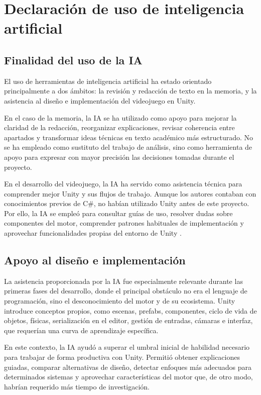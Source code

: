 \chapter{Declaración de uso de inteligencia artificial}

\section{Finalidad del uso de la IA}
El uso de herramientas de inteligencia artificial ha estado orientado principalmente a dos
ámbitos: la revisión y redacción de texto en la memoria, y la asistencia al diseño e
implementación del videojuego en Unity.

En el caso de la memoria, la IA se ha utilizado como apoyo para mejorar la claridad de la
redacción, reorganizar explicaciones, revisar coherencia entre apartados y transformar
ideas técnicas en texto académico más estructurado. No se ha empleado como sustituto del
trabajo de análisis, sino como herramienta de apoyo para expresar con mayor precisión las
decisiones tomadas durante el proyecto.

En el desarrollo del videojuego, la IA ha servido como asistencia técnica para comprender
mejor Unity y sus flujos de trabajo. Aunque los autores contaban con conocimientos previos
de C\#, no habían utilizado Unity antes de este proyecto. Por ello, la IA se empleó para
consultar guías de uso, resolver dudas sobre componentes del motor, comprender patrones
habituales de implementación y aprovechar funcionalidades propias del entorno de Unity \cite{unityLearnGettingStarted,unityScriptableObject}.

\section{Apoyo al diseño e implementación}
La asistencia proporcionada por la IA fue especialmente relevante durante las primeras fases
del desarrollo, donde el principal obstáculo no era el lenguaje de programación, sino el
desconocimiento del motor y de su ecosistema. Unity introduce conceptos propios, como
escenas, prefabs, componentes, ciclo de vida de objetos, físicas, serialización en el
editor, gestión de entradas, cámaras e interfaz, que requerían una curva de aprendizaje
específica.

En este contexto, la IA ayudó a superar el umbral inicial de habilidad necesario para
trabajar de forma productiva con Unity. Permitió obtener explicaciones guiadas, comparar
alternativas de diseño, detectar enfoques más adecuados para determinados sistemas y
aprovechar características del motor que, de otro modo, habrían requerido más tiempo de
investigación.

